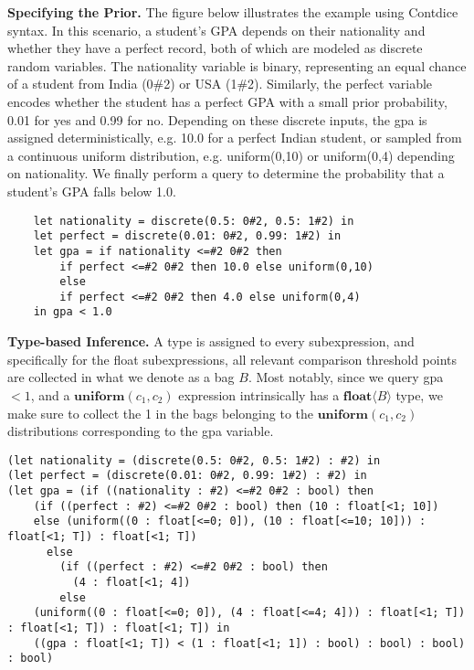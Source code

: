 \documentclass[acmsmall,screen,dvipsnames,x11names,nonacm,anonymous,review]{acmart}
\begin{document}
\textbf{Specifying the Prior.} The figure below illustrates the example using Contdice syntax. In this scenario, a student's GPA depends on their nationality and whether they have a perfect record, both of which are modeled as discrete random variables. The nationality variable is binary, representing an equal chance of a student from India (0\#2) or USA (1\#2). Similarly, the perfect variable encodes whether the student has a perfect GPA with a small prior probability, 0.01 for yes and 0.99 for no. Depending on these discrete inputs, the gpa is assigned deterministically, e.g. 10.0 for a perfect Indian student, or sampled from a continuous uniform distribution, e.g. uniform(0,10) or uniform(0,4) depending on nationality. We finally perform a query to determine the probability that a student's GPA falls below 1.0.

\begin{lstlisting}
    let nationality = discrete(0.5: 0#2, 0.5: 1#2) in
    let perfect = discrete(0.01: 0#2, 0.99: 1#2) in
    let gpa = if nationality <=#2 0#2 then 
        if perfect <=#2 0#2 then 10.0 else uniform(0,10)
        else
        if perfect <=#2 0#2 then 4.0 else uniform(0,4) 
    in gpa < 1.0
\end{lstlisting}


\textbf{Type-based Inference.} A type is assigned to every subexpression, and specifically for the float subexpressions, all relevant comparison threshold points are collected in what we denote as a bag $B$. Most notably, since we query gpa $< 1$, and a $\textbf{uniform}(c_1,c_2)$ expression intrinsically has a $\textbf{float}\langle B \rangle$ type, we make sure to collect the 1 in the bags belonging to the $\textbf{uniform}(c_1,c_2)$ distributions corresponding to the gpa variable.

\begin{lstlisting}
(let nationality = (discrete(0.5: 0#2, 0.5: 1#2) : #2) in
(let perfect = (discrete(0.01: 0#2, 0.99: 1#2) : #2) in
(let gpa = (if ((nationality : #2) <=#2 0#2 : bool) then
    (if ((perfect : #2) <=#2 0#2 : bool) then (10 : float[<1; 10])
    else (uniform((0 : float[<=0; 0]), (10 : float[<=10; 10])) : float[<1; T]) : float[<1; T])
      else
        (if ((perfect : #2) <=#2 0#2 : bool) then
          (4 : float[<1; 4])
        else
    (uniform((0 : float[<=0; 0]), (4 : float[<=4; 4])) : float[<1; T]) : float[<1; T]) : float[<1; T]) in
    ((gpa : float[<1; T]) < (1 : float[<1; 1]) : bool) : bool) : bool) : bool)
\end{lstlisting}
\end{document}
